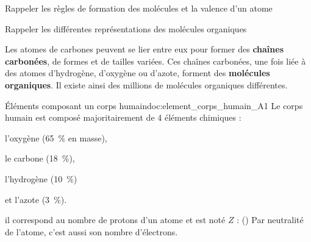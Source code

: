 \teteTermStssOrga

\vspace*{-30pt}

\begin{objectifs}
  \item Rappeler les règles de formation des molécules et la valence d'un atome
  \item Rappeler les différentes représentations des molécules organiques
\end{objectifs}

\begin{contexte}
  Les atomes de carbones peuvent se lier entre eux pour former des \textbf{chaînes carbonées}, de formes et de tailles variées.
  Ces chaînes carbonées, une fois liée à des atomes d'hydrogène, d'oxygène ou d'azote, forment des \textbf{molécules organiques}.
  Il existe ainsi des millions de molécules organiques différentes.

\end{contexte}


\vspace*{-8pt}
\vspace*{-8pt}

\begin{doc}{Éléments composant un corps humain}{doc:element_corps_humain_A1}
  Le corps humain est composé majoritairement de 4 éléments chimiques :
  \vspace*{-4pt}
  \begin{multicols}{2}
  \begin{listePoints}
    \item l'oxygène   \oxygene (\qty{65}{\percent} en masse),
    \item le carbone  \carbone (\qty{18}{\percent}),
    \item l'hydrogène \hydrogene (\qty{10}{\percent})
    \item et l'azote   (\qty{3}{\percent}).
  \end{listePoints}
  \end{multicols}
  
  \begin{encart}
     il correspond au nombre de protons d'un atome et est noté $Z$ :  (\hspace{-8pt}\exemple {})
    Par neutralité de l'atome, c'est aussi son nombre d'électrons.
  \end{encart}
\end{doc}


